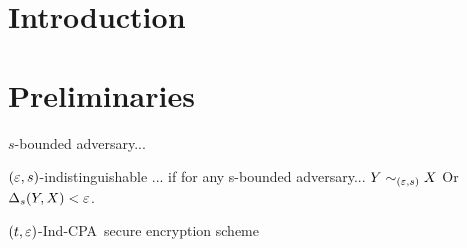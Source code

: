 \documentclass{article}
\newcommand{\tcpa}{$(t,\eps)$-Ind-CPA}
\begin{document}
\title{}
\author{}

\maketitle

\def \cF {\F}

\begin{abstract}
\end{abstract}

\section{Introduction}
\section{Preliminaries}

$s$-bounded adversary...
\begin{definition}
$(\varepsilon,s)$-indistinguishable ...  if for any s-bounded adversary...
$Y \sim_{(\varepsilon,s)} X$ Or $\Delta_{s}(Y,X)<\varepsilon$.
\end{definition}

\begin{definition} 
\tcpa~secure encryption scheme
\end{definition}
\end{document}
